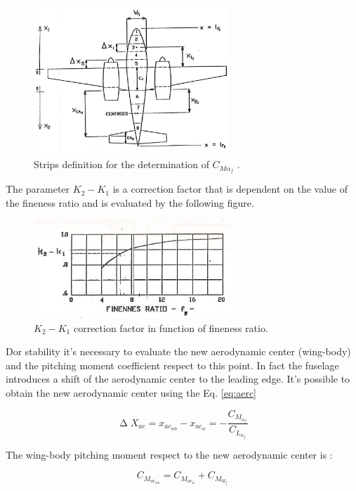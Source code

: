 \begin{figure}[H]
\centering
\includegraphics[height=5.6cm]{Immagini/stripsalfa}
\caption{Strips definition for the determination of $C_{{M\alpha}_f}$ .}
\label{wing}
\end{figure}


The parameter $K_2-K_1$ is a correction factor that is dependent on the value of the fineness ratio and is evaluated by the following figure.\cite{adas}


\begin{figure}[H]
\centering
\includegraphics[height=3.7cm]{Immagini/kdue}
\caption{$K_2-K_1$ correction factor in function of fineness ratio.}
\label{kfactor}
\end{figure}

Dor stability it's necessary to evaluate the new aerodynamic center (wing-body) and the pitching moment coefficient respect to this point. In fact the fuselage introduces a shift of the aerodynamic center to the leading edge. 
It's possible to obtain the new aerodynamic center using the Eq. \ref{eq:aerc}

\begin{equation}
\upDelta X_{ac} = x_{ac_{wb}} - x_{ac_{w}} = -\frac{C_{M_{\alpha_f}}}{C_{L_{\alpha_f}}}
\label{eq:aerc}
\end{equation}

The wing-body pitching moment respect to the new aerodynamic center is :

\begin{equation}
C_{M_{ac_{wb}}} = C_{M_{ac_{w}}}  + C_{M_{0l_f}}
\end{equation}

